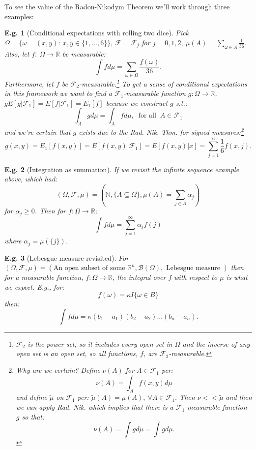\documentclass{tufte-book}
\theoremstyle{mytheoremstyle}
\theoremstyle{mylemstyle}
\theoremstyle{mydefstyle}
\newtheorem*{ex}{E.g.}
\begin{document}
\noindent To see the value of the Radon-Nikodym Theorem we'll work through three examples:
\begin{ex}[Conditional expectations with rolling two dice] Pick \(\Omega = \{\omega = (x, y):\ x, y \in \{1, \dots, 6\}\},\ \mathcal{F} = \mathcal{F}_j\) for \(j = 0, 1, 2,\ \mu(A) = \sum_{\omega \in A} \frac{1}{36}\). Also, let \(f:\ \Omega \rightarrow \mathbb{R}\) be measurable:
	\[\int f d\mu = \sum_{\omega \in \Omega} \frac{f(\omega)}{36} \text{.}\]
Furthermore, let \(f\) be \(\mathcal{F}_2\)-measurable.\footnote[][.3cm]{\(\mathcal{F}_2\) is the power set, so it includes every open set in \(\Omega\) and the inverse of any open set is an open set, so all functions, \(f\), are \(\mathcal{F}_2\)-measurable.} To get a sense of conditional expectations in this framework we want to find a \(\mathcal{F}_1\)-measurable function \(g:\Omega \rightarrow \mathbb{R}\), \(g E[g|\mathcal{F}_1] = E[f|\mathcal{F}_1] = E_1[f]\) because we construct \(g\) s.t.:
	\[\int_A g d\mu = \int_A f d\mu,\ \text{ for all }\ A \in \mathcal{F}_1\]
and we're certain that \(g\) exists due to the Rad.-Nik. Thm. for signed measures:\footnote[][.3cm]{Why are we certain? Define \(\nu(A)\) for \(A \in \mathcal{F}_1\) per:
	\[\nu(A) = \int_A f(x, y)d\mu\]
and define \(\tilde{\mu}\) on \(\mathcal{F}_1\) per: \(\tilde{\mu}(A) = \mu(A),\ \forall A \in \mathcal{F}_1\). Then \(\nu << \tilde{\mu}\) and then we can apply Rad.-Nik. which implies that there is a \(\mathcal{F}_1\)-measurable function \(g\) so that:
	\[\nu(A) = \int g d\tilde{\mu} = \int g d\mu \text{.}\]}
	\[g(x, y) = E_1[f(x, y)] = E[f(x, y)|\mathcal{F}_1] = E[f(x, y)| x] = \sum_{j = 1}^6 \frac{1}{6} f(x, j) \text{.}\]
\end{ex}
\begin{ex}[Integration as summation] If we revisit the infinite sequence example above, which had:
	\[(\Omega, \mathcal{F}, \mu) = \left(\mathbb{N}, \{A \subseteq \Omega\}, \mu(A) = \sum_{j \in A} \alpha_j\right)\]
for \(\alpha_j \ge 0\). Then for \(f: \Omega \rightarrow \mathbb{R}\):
	\[\int f d\mu = \sum_{j=1}^\infty \alpha_j f(j)\]
where \(\alpha_j = \mu(\{j\})\). 
\end{ex}
\begin{ex}[Lebesgue measure revisited] For \((\Omega, \mathcal{F}, \mu) = (\text{An open subset of some } \mathbb{R}^n, \mathcal{B}(\Omega), \text{ Lebesgue measure })\) then for a measurable function, \(f: \Omega \rightarrow \mathbb{R}\), the integral over \(f\) with respect to \(\mu\) is what we expect. E.g., for:
	\[f(\omega) = \kappa I\{\omega \in B\}\]
then:
	\[\int f d\mu = \kappa (b_1 - a_1)(b_2 - a_2)\dots(b_n - a_n) \text{.}\]
\end{ex}
\end{document}
